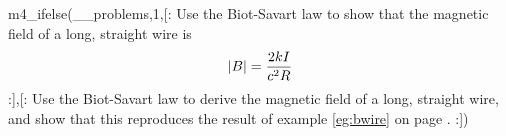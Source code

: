   m4_ifelse(__problems,1,[:%
        Use the Biot-Savart law to show that the magnetic field of a long, straight wire
        is 
        \begin{equation*}
                | B| = \frac{2 kI}{ c^2 R}\\
        \end{equation*}
:],[:%
        Use the Biot-Savart law to derive the magnetic field of a long, straight wire,
        and show that this reproduces the result of example \ref{eg:bwire} on page \pageref{eg:bwire}.
:])
